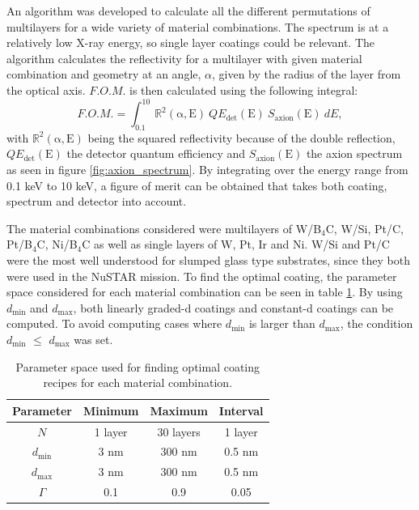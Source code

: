 An algorithm was developed to calculate all the different permutations of multilayers for a wide variety of material combinations. The spectrum is at a relatively low X-ray energy, so single layer coatings could be relevant. The algorithm calculates the reflectivity for a multilayer with given material combination and geometry at an angle, $\alpha$, given by the radius of the layer from the optical axis. $F.O.M.$ is then calculated using the following integral:
\begin{equation}\label{eq:fom}
	F.O.M. = \int_{0.1}^{10} \mathbb{R}^2(\mathrm{\alpha},\text{E})\ QE_{\text{det}}(\text{E})\ S_{\text{axion}}(\text{E})\ dE,
\end{equation}
with $\mathbb{R}^2(\mathrm{\alpha},\text{E})$ being the squared reflectivity because of the double reflection, $QE_{\text{det}}(\text{E})$ the detector quantum efficiency and $S_{\text{axion}}(\text{E})$ the axion spectrum as seen in figure \ref{fig:axion_spectrum}. By integrating over the energy range from 0.1 keV to 10 keV, a figure of merit can be obtained that takes both coating, spectrum and detector into account.

The material combinations considered were multilayers of W/B$_4$C, W/Si, Pt/C, Pt/B$_4$C, Ni/B$_4$C as well as single layers of W, Pt, Ir and Ni. W/Si and Pt/C were the most well understood for slumped glass type substrates, since they both were used in the NuSTAR mission. To find the optimal coating, the parameter space considered for each material combination can be seen in table \ref{tab:cast_parameter_space}. By using $d_{\text{min}}$ and $d_{\text{max}}$, both linearly graded-d coatings and constant-d coatings can be computed. To avoid computing cases where \(d_{\text{min}}\) is larger than \(d_{\text{max}}\), the condition \(d_{\text{min}}\) $\leq$ \(d_{\text{max}}\) was set.

\begin{table}[!h]
\begin{center}
\begin{tabular}{c|c|c|c}
Parameter & Minimum & Maximum & Interval \\
\hline
$N$ & 1 layer & 30 layers & 1 layer \\
$d_{\text{min}}$ & 3 nm & 300 nm & 0.5 nm \\
$d_{\text{max}}$ & 3 nm & 300 nm & 0.5 nm \\
$\Gamma$ & 0.1 & 0.9 & 0.05 \\
\end{tabular}
\end{center}
\caption{\footnotesize Parameter space used for finding optimal coating recipes for each material combination.}\label{tab:cast_parameter_space}
\end{table}

